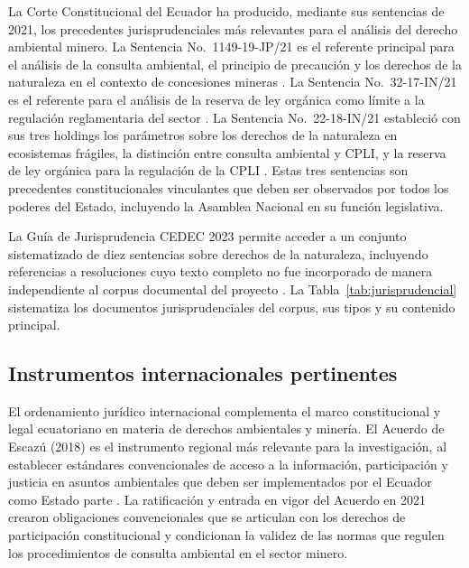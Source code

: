 La Corte Constitucional del Ecuador ha producido, mediante sus sentencias de 2021, los precedentes jurisprudenciales más relevantes para el análisis del derecho ambiental minero. La Sentencia No.\ 1149-19-JP/21 es el referente principal para el análisis de la consulta ambiental, el principio de precaución y los derechos de la naturaleza en el contexto de concesiones mineras \parencite{cce_1149_19_jp_21}. La Sentencia No.\ 32-17-IN/21 es el referente para el análisis de la reserva de ley orgánica como límite a la regulación reglamentaria del sector \parencite{cce_32_17_in_21}. La Sentencia No.\ 22-18-IN/21 estableció con sus tres holdings los parámetros sobre los derechos de la naturaleza en ecosistemas frágiles, la distinción entre consulta ambiental y CPLI, y la reserva de ley orgánica para la regulación de la CPLI \parencite{cce_22_18_in_21}. Estas tres sentencias son precedentes constitucionales vinculantes que deben ser observados por todos los poderes del Estado, incluyendo la Asamblea Nacional en su función legislativa.

La Guía de Jurisprudencia CEDEC 2023 permite acceder a un conjunto sistematizado de diez sentencias sobre derechos de la naturaleza, incluyendo referencias a resoluciones cuyo texto completo no fue incorporado de manera independiente al corpus documental del proyecto \parencite{cedec_guia_2023}. La Tabla~\ref{tab:jurisprudencial} sistematiza los documentos jurisprudenciales del corpus, sus tipos y su contenido principal.



\subsection{Instrumentos internacionales pertinentes}

El ordenamiento jurídico internacional complementa el marco constitucional y legal ecuatoriano en materia de derechos ambientales y minería. El Acuerdo de Escazú (2018) es el instrumento regional más relevante para la investigación, al establecer estándares convencionales de acceso a la información, participación y justicia en asuntos ambientales que deben ser implementados por el Ecuador como Estado parte \parencite{acuerdo_escazu_2018}. La ratificación y entrada en vigor del Acuerdo en 2021 crearon obligaciones convencionales que se articulan con los derechos de participación constitucional y condicionan la validez de las normas que regulen los procedimientos de consulta ambiental en el sector minero.


